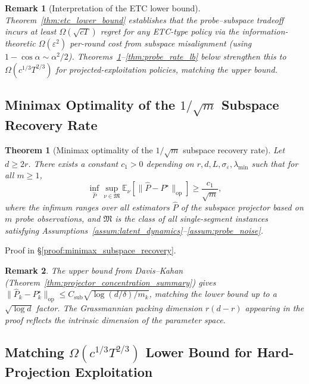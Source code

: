 \documentclass{article}
\newcommand{\E}{\mathbb{E}}
\newcommand{\op}{\mathrm{op}}
\newtheorem{theorem}{Theorem}
\newtheorem{remark}{Remark}
\begin{document}
\begin{remark}[Interpretation of the ETC lower bound]
\label{rem:etc_lb_interpretation}
Theorem~\ref{thm:etc_lower_bound} establishes that the probe--subspace tradeoff incurs at least $\Omega(\sqrt{cT})$ regret for any ETC-type policy via the information-theoretic $\Omega(\varepsilon^2)$ per-round cost from subspace misalignment (using $1 - \cos\alpha \sim \alpha^2/2$).
Theorems~\ref{thm:minimax_subspace_recovery}--\ref{thm:probe_rate_lb} below strengthen this to $\Omega(c^{1/3}T^{2/3})$ for projected-exploitation policies, matching the upper bound.
\end{remark}

\subsection{\texorpdfstring{Minimax Optimality of the $1/\sqrt{m}$ Subspace Recovery Rate}{Minimax Optimality of the 1/sqrt(m) Subspace Recovery Rate}}
\label{app:minimax_subspace}

\begin{theorem}[Minimax optimality of the $1/\sqrt{m}$ subspace recovery rate]
\label{thm:minimax_subspace_recovery}
Let $d \ge 2r$. There exists a constant $c_1 > 0$ depending on $r, d, L, \sigma_\varepsilon, \lambda_{\min}$ such that for all $m \ge 1$,
\[
\inf_{\widehat{P}} \sup_{\nu \in \mathfrak{M}}
\E_\nu\!\left[\|\widehat{P} - P^\star\|_{\op}\right]
\ge \frac{c_1}{\sqrt{m}},
\]
where the infimum ranges over all estimators $\widehat{P}$ of the subspace projector based on $m$ probe observations, and $\mathfrak{M}$ is the class of all single-segment instances satisfying Assumptions~\ref{assum:latent_dynamics}--\ref{assum:probe_noise}.
\end{theorem}

Proof in \S\ref{proof:minimax_subspace_recovery}.

\begin{remark}
The upper bound from Davis--Kahan (Theorem~\ref{thm:projector_concentration_summary}) gives $\|\widehat{P}_k - P_k^\star\|_{\op} \le C_{\mathrm{sub}}\sqrt{\log(d/\delta)/m_k}$, matching the lower bound up to a $\sqrt{\log d}$ factor.  The Grassmannian packing dimension $r(d-r)$ appearing in the proof reflects the intrinsic dimension of the parameter space.
\end{remark}

\subsection{\texorpdfstring{Matching $\Omega(c^{1/3}T^{2/3})$ Lower Bound for Hard-Projection Exploitation}{Matching Lower Bound for Hard-Projection Exploitation}}
\label{app:matching_lower_bound}
\end{document}
